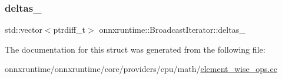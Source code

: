\subsubsection{\texorpdfstring{deltas\+\_\+}{deltas\_}}
{\footnotesize\ttfamily std\+::vector$<$ptrdiff\+\_\+t$>$ onnxruntime\+::\+Broadcast\+Iterator\+::deltas\+\_\+}



The documentation for this struct was generated from the following file\+:\begin{DoxyCompactItemize}
\item 
onnxruntime/onnxruntime/core/providers/cpu/math/\mbox{\hyperlink{element__wise__ops_8cc}{element\+\_\+wise\+\_\+ops.\+cc}}\end{DoxyCompactItemize}
